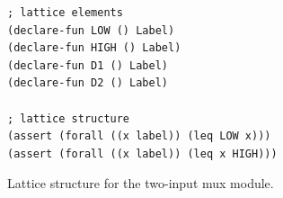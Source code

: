\documentclass [12pt, oneside, a4paper]{article}
\begin{document}
{\begin{figure}
\centering
\begin{minipage}{.8\linewidth}
\begin{lstlisting}[language=z3]
; lattice elements
(declare-fun LOW () Label)
(declare-fun HIGH () Label)
(declare-fun D1 () Label)
(declare-fun D2 () Label)

; lattice structure
(assert (forall ((x label)) (leq LOW x)))
(assert (forall ((x label)) (leq x HIGH)))
\end{lstlisting}
\end{minipage}
\caption{Lattice structure for the two-input mux module.}
\label{fig:lattice}
\end{figure}

}
\end{document}

